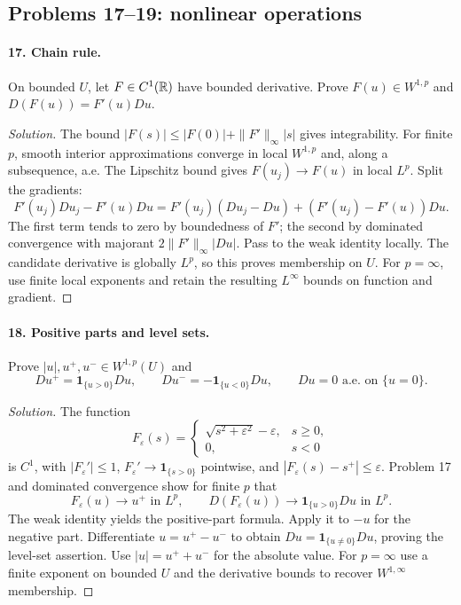 \subsection{Problems 17--19: nonlinear operations}
\paragraph{17. Chain rule.}
On bounded $U$, let $F\in C^1(\mathbb{R})$ have bounded derivative.
Prove $F(u)\in W^{1,p}$ and $D(F(u))=F'(u)Du$.
\begin{proof}[Solution]
The bound $|F(s)|\leq|F(0)|+\|F'\|_\infty|s|$ gives integrability.
For finite $p$, smooth interior approximations converge in local
$W^{1,p}$ and, along a subsequence, a.e.
The Lipschitz bound gives $F(u_j)\to F(u)$ in local $L^p$.
Split the gradients:
\[
 F'(u_j)Du_j-F'(u)Du
 =F'(u_j)(Du_j-Du)+(F'(u_j)-F'(u))Du.
\]
The first term tends to zero by boundedness of $F'$; the second by
dominated convergence with majorant $2\|F'\|_\infty|Du|$.
Pass to the weak identity locally. The candidate derivative is globally
$L^p$, so this proves membership on $U$.
For $p=\infty$, use finite local exponents and retain the resulting
$L^\infty$ bounds on function and gradient.
\end{proof}
\Needspace{45mm}

\paragraph{18. Positive parts and level sets.}
Prove $|u|,u^+,u^-\in W^{1,p}(U)$ and
\[
 Du^+=\mathbf1_{\{u>0\}}Du,\qquad
 Du^-=-\mathbf1_{\{u<0\}}Du,\qquad
 Du=0\text{ a.e. on }\{u=0\}.
\]
\begin{proof}[Solution]
The function
\[
 F_\varepsilon(s)=
 \begin{cases}\sqrt{s^2+\varepsilon^2}-\varepsilon,&s\geq0,\\
 0,&s<0\end{cases}
\]
is $C^1$, with $|F_\varepsilon'|\leq1$,
$F_\varepsilon'\to\mathbf1_{\{s>0\}}$ pointwise, and
$|F_\varepsilon(s)-s^+|\leq\varepsilon$.
Problem 17 and dominated convergence show for finite $p$ that
\[
 F_\varepsilon(u)\to u^+\text{ in }L^p,\qquad
 D(F_\varepsilon(u))\to\mathbf1_{\{u>0\}}Du\text{ in }L^p.
\]
The weak identity yields the positive-part formula. Apply it to $-u$
for the negative part.
Differentiate $u=u^+-u^-$ to obtain
$Du=\mathbf1_{\{u\ne0\}}Du$, proving the level-set assertion.
Use $|u|=u^++u^-$ for the absolute value.
For $p=\infty$ use a finite exponent on bounded $U$ and the derivative
bounds to recover $W^{1,\infty}$ membership.
\end{proof}
\Needspace{45mm}


